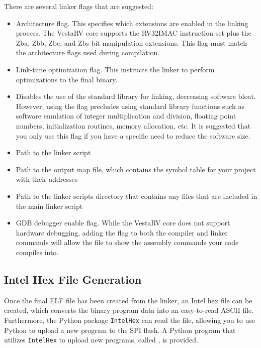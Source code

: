 \documentclass[11pt,pdftex,portrait,letterpaper]{article}
\begin{document}
There are several linker flags that are suggested:
\begin{itemize}
\item {} Architecture flag. This specifies which extensions are enabled in the linking process. The VestaRV core supports the RV32IMAC instruction set plus the Zba, Zbb, Zbc, and Zbs bit manipulation extensions. This flag must match the architecture flags used during compilation.
\item {} Link-time optimization flag. This instructs the linker to perform optimizations to the final binary.
\item {} Disables the use of the standard library for linking, decreasing software bloat. However, using the flag precludes using standard library functions such as software emulation of integer multiplication and division, floating point numbers, initialization routines, memory allocation, etc. It is suggested that you only use this flag if you have a specific need to reduce the software size.
\item {} Path to the linker script
\item {} Path to the output map file, which contains the symbol table for your project with their addresses
\item {} Path to the linker scripts directory that contains any files that are included in the main linker script
\item {} GDB debugger enable flag. While the VestaRV core does not support hardware debugging, adding the  flag to both the compiler and linker commands will allow the  file to show the assembly commands your code compiles into.
\end{itemize}


\subsection{Intel Hex File Generation}
Once the final ELF file has been created from the linker, an Intel hex file can be created, which converts the binary program data into an easy-to-read ASCII file. Furthermore, the Python package \texttt{IntelHex} can read the file, allowing you to use Python to upload a new program to the SPI flash. A Python program that utilizes \texttt{IntelHex} to upload new programs, called , is provided.
\end{document}
